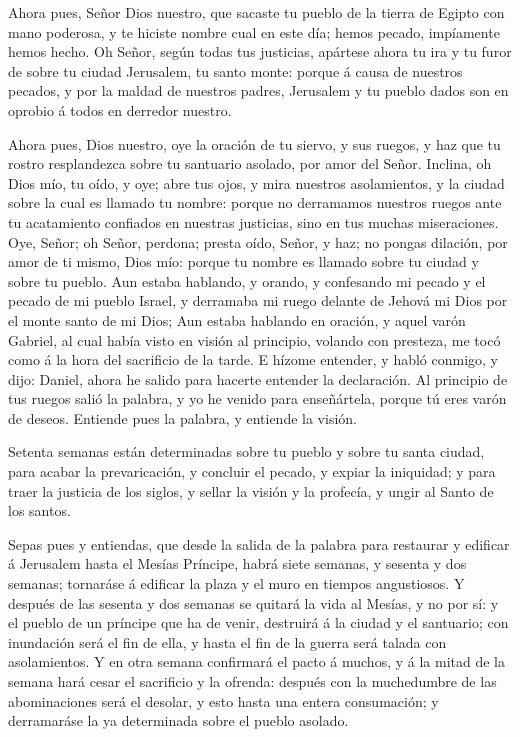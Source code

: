  Ahora pues, Señor Dios nuestro, que sacaste tu pueblo de
la tierra de Egipto con mano poderosa, y te hiciste nombre cual en este
día; hemos pecado, impíamente hemos hecho.  Oh Señor, según
todas tus justicias, apártese ahora tu ira y tu furor de sobre tu ciudad
Jerusalem, tu santo monte: porque á causa de nuestros pecados, y por la
maldad de nuestros padres, Jerusalem y tu pueblo dados son en oprobio á
todos en derredor nuestro.

 Ahora pues, Dios nuestro, oye la oración de tu siervo, y
sus ruegos, y haz que tu rostro resplandezca sobre tu santuario asolado,
por amor del Señor.  Inclina, oh Dios mío, tu oído, y oye;
abre tus ojos, y mira nuestros asolamientos, y la ciudad sobre la cual
es llamado tu nombre: porque no derramamos nuestros ruegos ante tu
acatamiento confiados en nuestras justicias, sino en tus muchas
miseraciones.  Oye, Señor; oh Señor, perdona; presta oído,
Señor, y haz; no pongas dilación, por amor de ti mismo, Dios mío: porque
tu nombre es llamado sobre tu ciudad y sobre tu pueblo. 
Aun estaba hablando, y orando, y confesando mi pecado y el pecado de mi
pueblo Israel, y derramaba mi ruego delante de Jehová mi Dios por el
monte santo de mi Dios;  Aun estaba hablando en oración, y
aquel varón Gabriel, al cual había visto en visión al principio, volando
con presteza, me tocó como á la hora del sacrificio de la tarde.
 E hízome entender, y habló conmigo, y dijo: Daniel, ahora
he salido para hacerte entender la declaración.  Al
principio de tus ruegos salió la palabra, y yo he venido para
enseñártela, porque tú eres varón de deseos. Entiende pues la palabra, y
entiende la visión.

 Setenta semanas están determinadas sobre tu pueblo y sobre
tu santa ciudad, para acabar la prevaricación, y concluir el pecado, y
expiar la iniquidad; y para traer la justicia de los siglos, y sellar la
visión y la profecía, y ungir al Santo de los santos.

 Sepas pues y entiendas, que desde la salida de la palabra
para restaurar y edificar á Jerusalem hasta el Mesías Príncipe, habrá
siete semanas, y sesenta y dos semanas; tornaráse á edificar la plaza y
el muro en tiempos angustiosos.  Y después de las sesenta y
dos semanas se quitará la vida al Mesías, y no por sí: y el pueblo de un
príncipe que ha de venir, destruirá á la ciudad y el santuario; con
inundación será el fin de ella, y hasta el fin de la guerra será talada
con asolamientos.  Y en otra semana confirmará el pacto á
muchos, y á la mitad de la semana hará cesar el sacrificio y la ofrenda:
después con la muchedumbre de las abominaciones será el desolar, y esto
hasta una entera consumación; y derramaráse la ya determinada sobre el
pueblo asolado.

